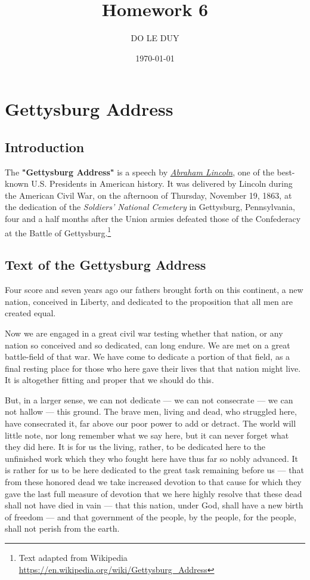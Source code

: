 \documentclass[12pt,twocolumn]{article}
\title{Homework 6}
\author{DO LE DUY}
\date{\today}
\begin{document}
\maketitle

\section{Gettysburg Address} %
\subsection{Introduction} %
The \textbf{"Gettysburg Address"} is a speech by \underline{\emph{Abraham Lincoln}}, one of the best-known U.S. Presidents in American history. It was delivered by Lincoln during the American Civil War, on the afternoon of Thursday, November 19, 1863, at the dedication of the \emph{Soldiers' National Cemetery} in Gettysburg, Pennsylvania, four and a half months after the Union armies defeated those of the Confederacy at the Battle of Gettysburg.\footnote{Text adapted from Wikipedia \href{https://en.wikipedia.org/wiki/Gettysburg\_Address}{https://en.wikipedia.org/wiki/Gettysburg\_Address}}
\subsection{Text of the Gettysburg Address} %
Four score and seven years ago our fathers brought forth on this continent, a new nation, conceived in Liberty, and dedicated to the proposition that all men are created equal. 

Now we are engaged in a great civil war testing whether that nation, or any nation so conceived and so dedicated, can long endure. We are met on a great battle-field of that war. We have come to dedicate a portion of that field, as a final resting place for those who here gave their lives that that nation might live. It is altogether fitting and proper that we should do this.

But, in a larger sense, we can not dedicate — we can not consecrate — we can not hallow — this ground. The brave men, living and dead, who struggled here, have consecrated it, far above our poor power to add or detract. The world will little note, nor long remember what we say here, but it can never forget what they did here. It is for us the living, rather, to be dedicated here to the unfinished work which they who fought here have thus far so nobly advanced. It is rather for us to be here dedicated to the great task remaining before us — that from these honored dead we take increased devotion to that cause for which they gave the last full measure of devotion that we here highly resolve that these dead shall not have died in vain — that this nation, under God, shall have a new birth of freedom — and that government of the people, by the people, for the people, shall not perish from the earth.
\end{document}
